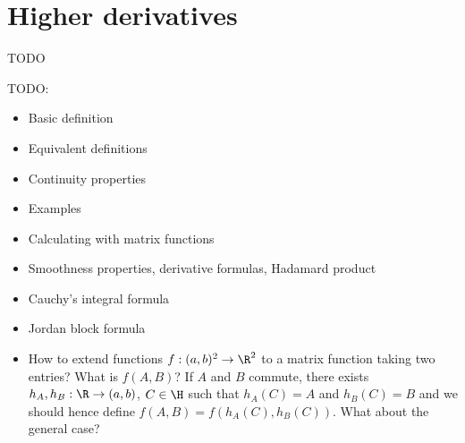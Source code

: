 \section{Higher derivatives}

TODO

TODO:
\begin{itemize}
	\item Basic definition
	\item Equivalent definitions
	\item Continuity properties
	\item Examples
	\item Calculating with matrix functions
	\item Smoothness properties, derivative formulas, Hadamard product
	\item Cauchy's integral formula
	\item Jordan block formula
	\item How to extend functions $f : (a, b)^2 \to \R^{2}$ to a matrix function taking two entries? What is $f(A, B)$? If $A$ and $B$ commute, there exists $h_{A}, h_{B} : \R \to (a, b)$, $C \in \H$ such that $h_{A}(C) = A$ and $h_{B}(C) = B$ and we should hence define $f(A, B) = f(h_{A}(C), h_{B}(C))$. What about the general case?
\end{itemize}

